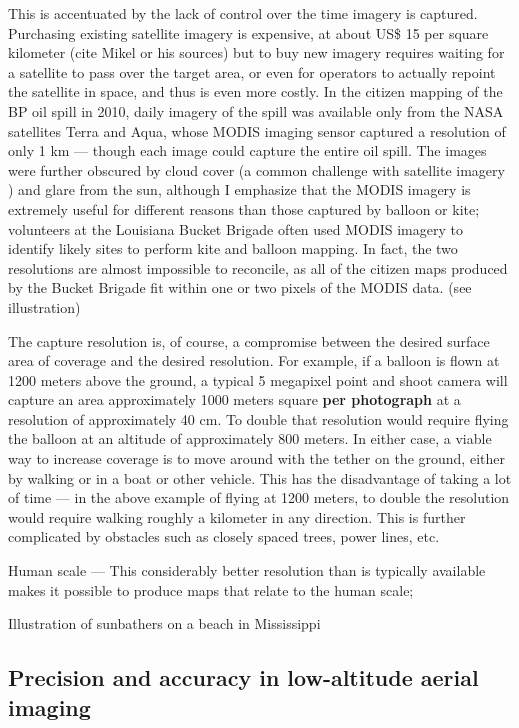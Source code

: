 \documentclass[11pt]{report}
\begin{document}
This is accentuated by the lack of control over the time imagery is captured. Purchasing existing satellite imagery is expensive, at about US\$ 15 per square kilometer (cite Mikel or his sources) but to buy new imagery requires waiting for a satellite to pass over the target area, or even for operators to actually repoint the satellite in space, and thus is even more costly. In the citizen mapping of the BP oil spill in 2010, daily imagery of the spill was available only from the NASA satellites Terra and Aqua, whose MODIS imaging sensor captured a resolution of only 1 km --- though each image could capture the entire oil spill. The images were further obscured by cloud cover (a common challenge with satellite imagery \cite{miyamoto2004use}) and glare from the sun, although I emphasize that the MODIS imagery is extremely useful for different reasons than those captured by balloon or kite; volunteers at the Louisiana Bucket Brigade often used MODIS imagery to identify likely sites to perform kite and balloon mapping. In fact, the two resolutions are almost impossible to reconcile, as all of the citizen maps produced by the Bucket Brigade fit within one or two pixels of the MODIS data. (see illustration)


The capture resolution is, of course, a compromise between the desired surface area of coverage and the desired resolution. For example, if a balloon is flown at 1200 meters above the ground, a typical 5 megapixel point and shoot camera will capture an area approximately 1000 meters square \textbf{per photograph} at a resolution of approximately 40 cm. To double that resolution would require flying the balloon at an altitude of approximately 800 meters. In either case, a viable way to increase coverage is to move around with the tether on the ground, either by walking or in a boat or other vehicle. This has the disadvantage of taking a lot of time --- in the above example of flying at 1200 meters, to double the resolution would require walking roughly a kilometer in any direction. This is further complicated by obstacles such as closely spaced trees, power lines, etc.

Human scale --- This considerably better resolution than is typically available makes it possible to produce maps that relate to the human scale; 

Illustration of sunbathers on a beach in Mississippi

\subsection{Precision and accuracy in low-altitude aerial imaging}
\end{document}
